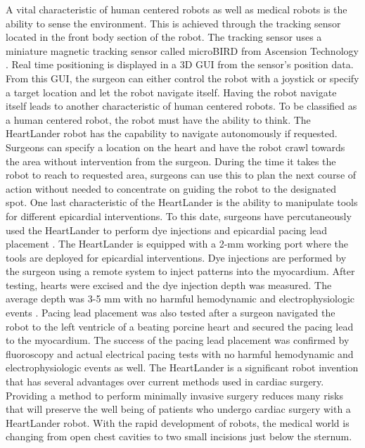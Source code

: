 \documentclass[11pt,conference]{IEEEtran}
\begin{document}
\newline
\indent A vital characteristic of human centered robots as well as medical robots is the ability to sense the environment. This is achieved through the tracking sensor located in the front body section of the robot. The tracking sensor uses a miniature magnetic tracking sensor called microBIRD from Ascension Technology \cite{design}. Real time positioning is displayed in a 3D GUI from the sensor's position data. From this GUI, the surgeon can either control the robot with a joystick or specify a target location and let the robot navigate itself. Having the robot navigate itself leads to another characteristic of human centered robots.
\newline
\indent To be classified as a human centered robot, the robot must have the ability to think. The HeartLander robot has the capability to navigate autonomously if requested. Surgeons can specify a location on the heart and have the robot crawl towards the area without intervention from the surgeon. During the time it takes the robot to reach to requested area, surgeons can use this to plan the next course of action without needed to concentrate on guiding the robot to the designated spot.
\newline
\indent One last characteristic of the HeartLander is the ability to manipulate tools for different epicardial interventions. To this date, surgeons have percutaneously used the HeartLander to perform dye injections and epicardial pacing lead placement \cite{design}. The HeartLander is equipped with a 2-mm working port where the tools are deployed for epicardial interventions. Dye injections are performed by the surgeon using a remote system to inject patterns into the myocardium. After testing, hearts were excised and the dye injection depth was measured. The average depth was 3-5 mm with no harmful hemodynamic and electrophysiologic events \cite{results}. Pacing lead placement was also tested after a surgeon navigated the robot to the left ventricle of a beating porcine heart and secured the pacing lead to the myocardium. The success of the pacing lead placement was confirmed by fluoroscopy and actual electrical pacing tests with no harmful hemodynamic and electrophysiologic events as well.
\newline
\indent The HeartLander is a significant robot invention that has several advantages over current methods used in cardiac surgery. Providing a method to perform minimally invasive surgery reduces many risks that will preserve the well being of patients who undergo cardiac surgery with a HeartLander robot. With the rapid development of robots, the medical world is changing from open chest cavities to two small incisions just below the sternum. 

\end{document}
